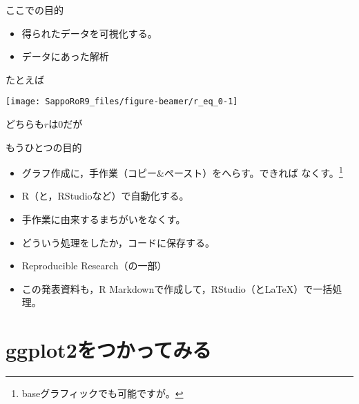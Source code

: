 \documentclass[ignorenonframetext,]{beamer}
\providecommand{\tightlist}{%
  \setlength{\itemsep}{0pt}\setlength{\parskip}{0pt}}
\begin{document}
\begin{frame}{ここでの目的}

\Large

\begin{itemize}
\item
  得られたデータを可視化する。
\item
  データにあった解析
\end{itemize}

\end{frame}

\begin{frame}{たとえば}

\texttt{[image: SappoRoR9\_files/figure-beamer/r\_eq\_0-1]}

どちらも\(r\)は0だが

\end{frame}

\begin{frame}{もうひとつの目的}

\begin{itemize}
\tightlist
\item
  グラフ作成に，手作業（コピー\&ペースト）をへらす。できれば
  なくす。\footnote{baseグラフィックでも可能ですが。}
\item
  R（と，RStudioなど）で自動化する。
\end{itemize}

\Large\bfseries

\begin{itemize}
\tightlist
\item
  手作業に由来するまちがいをなくす。
\item
  どういう処理をしたか，コードに保存する。
\item
  Reproducible Research（の一部）
\end{itemize}

\normalsize\mdseries

\begin{itemize}
\tightlist
\item
  この発表資料も，R Markdownで作成して，RStudio（とLaTeX）で一括処理。
\end{itemize}

\end{frame}

\section{ggplot2をつかってみる}\label{ggplot2}
\end{document}
